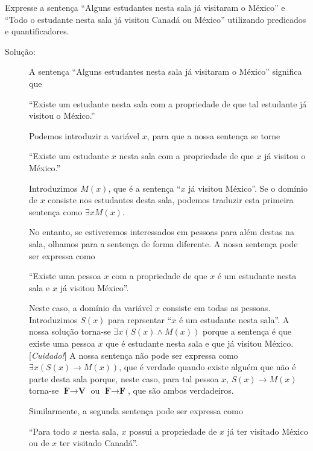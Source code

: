 \begin{exmp}
\label{exem147}
Expresse a sentença ``Alguns estudantes nesta sala já visitaram o México'' e
``Todo o estudante nesta sala já visitou Canadá ou México'' utilizando
predicados e quantificadores.
\begin{description}
\item[Solução:]A sentença ``Alguns estudantes nesta sala já visitaram o
México'' significa que
\begin{center}
``Existe um estudante nesta sala com a propriedade de que tal estudante já
visitou o México.''
\end{center}

Podemos introduzir a variável $x$, para que a nossa sentença se torne
\begin{center}
``Existe um estudante $x$ nesta sala com a propriedade de que $x$ já visitou o
México.''
\end{center}

Introduzimos $M(x)$, que é a sentença ``$x$ já visitou México''. Se o domínio de
$x$ consiste nos estudantes desta sala, podemos traduzir esta primeira sentença
como $\exists xM(x)$.

No entanto, se estiveremos interessados em pessoas para além destas na sala,
olhamos para a sentença de forma diferente. A nossa sentença pode ser expressa
como

\begin{center}
``Existe uma pessoa $x$ com a propriedade de que $x$ é um estudante nesta sala e
$x$ já visitou México''.
\end{center}

Neste caso, a domínio da variável $x$ consiste em todas as pessoas. Introduzimos
$S(x)$ para reprsentar ``$x$ é um estudante nesta sala''. A nossa solução
torna-se $\exists x(S(x) \land M(x))$ porque a sentença é que existe uma pessoa
$x$ que é estudante nesta sala e que já visitou México. [\emph{Cuidado!}] A
nossa sentença não pode ser expressa como $\exists x(S(x) \to M(x))$, que é
verdade quando existe alguém que não é parte desta sala porque, neste caso, para
tal pessoa $x$, $S(x) \to M(x)$ torna-se $\textbf{F} \to \textbf{V}$ ou
$\textbf{F} \to \textbf{F}$, que são ambos verdadeiros.

Similarmente, a segunda sentença pode ser expressa como

\begin{center}
``Para todo $x$ nesta sala, $x$ possui a propriedade de $x$ já ter visitado
México ou de $x$ ter visitado Canadá''.
\end{center}


\end{description}
\end{exmp}
